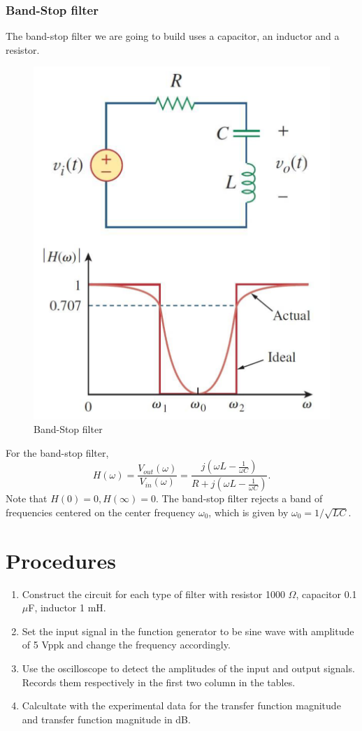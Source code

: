 \documentclass{article}
\begin{document}
\subsubsection{Band-Stop filter}
The band-stop filter we are going to build uses a capacitor, an inductor and a resistor.
\begin{figure}[H]\centering
    \includegraphics[scale=0.6]{bandstop.png}
    \caption{Band-Stop filter}
\end{figure}

For the band-stop filter,
$$H(\omega) = \frac{V_{out}(\omega)}{V_{in}(\omega)} = \frac{j(\omega L-\frac{1}{\omega C})}{R+j(\omega L-\frac{1}{\omega C})}.$$
Note that $H(0) = 0, H(\infty) = 0.$ The band-stop filter rejects a band of frequencies centered on the center frequency $\omega_0$, which is given by $\omega_0 = 1/\sqrt{LC}$.

\section{Procedures}
\begin{enumerate}
    \item Construct the circuit for each type of filter with resistor 1000 $\Omega$, capacitor 0.1 $\mu$F, inductor 1 mH.
    \item Set the input signal in the function generator to be sine wave with amplitude of 5 Vppk and change the frequency accordingly.
    \item Use the oscilloscope to detect the amplitudes of the input and output signals. Records them respectively in the first two column in the tables.
    \item Calcultate with the experimental data for the transfer function magnitude and transfer function magnitude in dB.
\end{enumerate}
\end{document}
